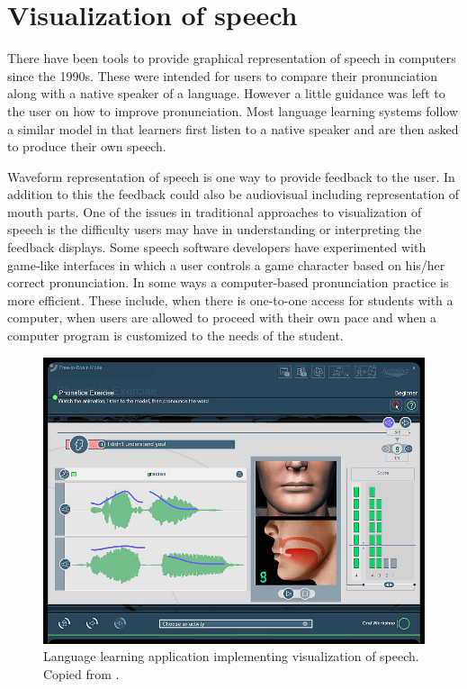 \documentclass[11pt,a4paper,oneside,article]{memoir}
\begin{document}
\section{Visualization of speech}
There have been tools to provide graphical representation of speech in computers since the 1990s. These were intended for users to compare their pronunciation along with a native speaker of a language. However a little guidance was left to the user on how to improve pronunciation. Most language learning systems follow a similar model in that learners first listen to a native speaker and are then asked to produce their own speech. \cite{rob}

Waveform representation of speech is one way to provide feedback to the user. In addition to this the feedback could also be audiovisual including representation of mouth parts. One of the issues in traditional approaches to visualization of speech is the difficulty users may have in understanding or interpreting the feedback displays. Some speech software developers have experimented with game-like interfaces in which a user controls a game character based on his/her correct pronunciation. In some ways a computer-based pronunciation practice is more efficient. These include, when there is  one-to-one access for students with a computer, when users are allowed to proceed with their own pace and when a computer program is customized to the needs of the student. \cite{rob}\\

\begin{figure}[h]
  \includegraphics[width=12cm]{viz}
  \caption{Language learning application implementing visualization of speech. Copied from \cite{tellmemore}.}
  \label{fig:viz}
\end{figure}
\end{document}
